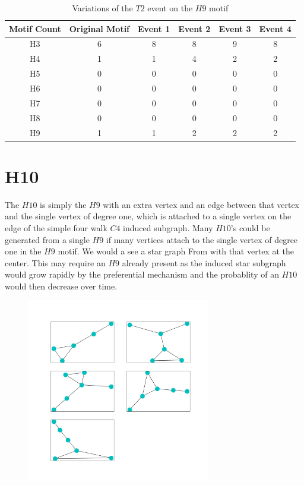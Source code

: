 \begin{table}
    \centering
    \begin{tabular}{||c c c c c c ||} 
    \hline
    Motif Count & Original Motif & Event 1 & Event 2 & Event 3  & Event 4\\ [0.5ex] 
    \hline\hline
    H3 & 6 & 8 & 8 & 9 & 8\\ 
    \hline
    H4 & 1 & 1 & 4 & 2 & 2 \\
    \hline
    H5 & 0 & 0 & 0 & 0 & 0\\
    \hline
    H6 & 0 & 0 & 0 & 0 & 0\\
    \hline
    H7 & 0 & 0 & 0 & 0 & 0\\
    \hline
    H8 & 0 & 0 & 0 & 0& 0\\
    \hline
    H9 & 1 & 1 & 2 & 2 &2\\
    \hline
   \end{tabular}
   \caption{Variations of the $T2$ event on the $H9$ motif}
   \label{table:7}
\end{table}

\section{H10}
The $H10$ is simply the $H9$ with an extra vertex and an edge between that vertex and the 
single vertex of degree one, which is attached to a single vertex on the edge of the simple
four walk $C4$ induced subgraph. Many $H10$'s could be generated from a single $H9$ if many vertices
attach to the single vertex of degree one in the $H9$ motif. We would a see a star graph From
with that vertex at the center. This may require an $H9$ already present as the induced star subgraph
would grow rapidly by the preferential mechanism and the probablity of an $H10$ would then decrease over
time.

\begin{figure}[!ht]
    \includegraphics[width=8cm]{Images/H10_evolution.png}
    \centering
\end{figure}

